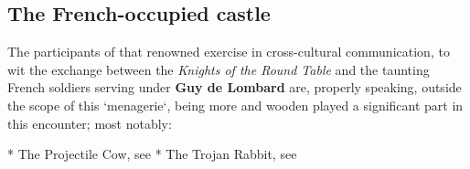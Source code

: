 \documentclass{metanorma}
\begin{document}

\subsection{The French-occupied castle}


The participants of that renowned exercise in cross-cultural
communication, to wit the exchange between the
\textit{Knights of the Round Table}
and the taunting French soldiers serving under 
\textbf{Guy de Lombard} are,
properly speaking, outside the scope of this `menagerie`, being more
and wooden played a significant part in this encounter; most
notably:

* The Projectile Cow, see 
* The Trojan Rabbit, see 

\end{document}
